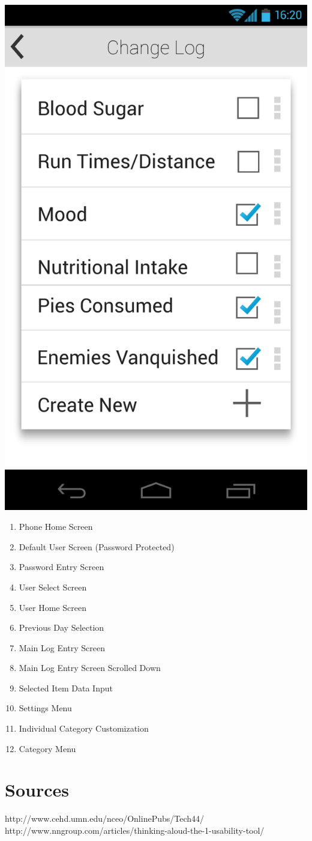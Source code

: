 \documentclass[pdftex,12pt,a4paper]{report}
\begin{document}
\includegraphics[scale=0.18]{Screens/05-Change-Log--Null.png}
\begin{enumerate}
\item{Phone Home Screen}
\item{Default User Screen (Password Protected)}
\item{Password Entry Screen}
\item{User Select Screen}
\item{User Home Screen}
\item{Previous Day Selection}
\item{Main Log Entry Screen}
\item{Main Log Entry Screen Scrolled Down}
\item{Selected Item Data Input}
\item{Settings Menu}
\item{Individual Category Customization}
\item{Category Menu}
\end{enumerate}
\section*{Sources}
http://www.cehd.umn.edu/nceo/OnlinePubs/Tech44/
\\http://www.nngroup.com/articles/thinking-aloud-the-1-usability-tool/
\end{document}
